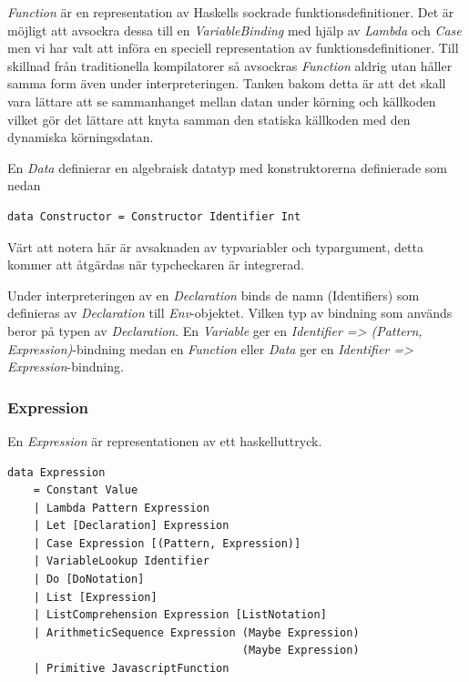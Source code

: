\emph{Function} är en representation av Haskells sockrade funktionsdefinitioner. Det är möjligt att avsockra dessa till en \emph{VariableBinding} med hjälp av \emph{Lambda} och \emph{Case} men vi har valt att införa en speciell representation av funktionsdefinitioner. Till skillnad från traditionella kompilatorer så avsockras \emph{Function} aldrig utan håller samma form även under interpreteringen. Tanken bakom detta är att det skall vara lättare att se sammanhanget mellan datan under körning och källkoden vilket gör det lättare att knyta samman den statiska källkoden med den dynamiska körningsdatan.

En \emph{Data} definierar en algebraisk datatyp med konstruktorerna definierade som nedan
\begin{lstlisting}
data Constructor = Constructor Identifier Int
\end{lstlisting}
Värt att notera här är avsaknaden av typvariabler och typargument, detta kommer att åtgärdas när typcheckaren är integrerad.

Under interpreteringen av en \emph{Declaration} binds de namn (Identifiers) som definieras av \emph{Declaration} till \emph{Env}-objektet. Vilken typ av bindning som används beror på typen av \emph{Declaration}. En \emph{Variable} ger en \emph{Identifier => (Pattern, Expression)}-bindning medan en \emph{Function} eller \emph{Data} ger en \emph{Identifier => Expression}-bindning.

\subsubsection{Expression}
En \emph{Expression} är representationen av ett haskelluttryck.

\begin{lstlisting}
data Expression 
    = Constant Value
    | Lambda Pattern Expression
    | Let [Declaration] Expression
    | Case Expression [(Pattern, Expression)]
    | VariableLookup Identifier
    | Do [DoNotation]
    | List [Expression]
    | ListComprehension Expression [ListNotation]
    | ArithmeticSequence Expression (Maybe Expression) 
                                    (Maybe Expression)
    | Primitive JavascriptFunction
\end{lstlisting}

